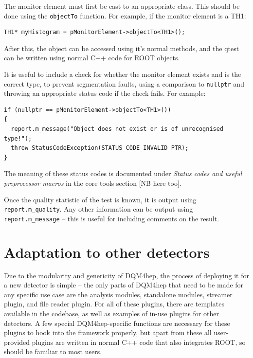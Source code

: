 The monitor element must first be cast to an appropriate class. This should be done using the \texttt{objectTo} function. For example, if the monitor element is a TH1:

\begin{verbatim}
TH1* myHistogram = pMonitorElement->objectTo<TH1>();
\end{verbatim}

After this, the object can be accessed using it's normal methods, and the qtest can be written using normal C++ code for ROOT objects.

It is useful to include a check for whether the monitor element exists and is the correct type, to prevent segmentation faults, using a comparison to \texttt{nullptr} and throwing an appropriate status code if the check fails. For example:

\begin{verbatim}
if (nullptr == pMonitorElement->objectTo<TH1>())
{
  report.m_message("Object does not exist or is of unrecognised type!");
  throw StatusCodeException(STATUS_CODE_INVALID_PTR);
}
\end{verbatim}

The meaning of these status codes is documented under \textit{Status codes and useful preprocessor macros} in the core tools section [NB here too].

Once the quality statistic of the test is known, it is output using \texttt{report.m\_quality}. Any other information can be output using \texttt{report.m\_message} – this is useful for including comments on the result.



\section{Adaptation to other detectors}
Due to the modularity and genericity of \acrshort{DQM4hep}, the process of deploying it for a new detector is simple -- the only parts of \acrshort{DQM4hep} that need to be made for any specific use case are the analysis modules, standalone modules, streamer plugin, and file reader plugin. For all of these plugins, there are templates available in the codebase, as well as examples of in-use plugins for other detectors. A few special \acrshort{DQM4hep}-specific functions are necessary for these plugins to hook into the framework properly, but apart from these all user-provided plugins are written in normal C++ code that also integrates ROOT, so should be familiar to most users.

